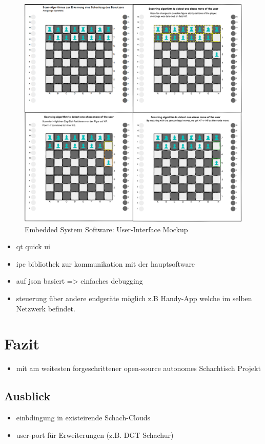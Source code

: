\begin{figure}
\centering
\includegraphics{images/ATC_ChessMoveAlgorithm.png}
\caption{Embedded System Software: User-Interface Mockup}
\end{figure}

\begin{itemize}
\tightlist
\item
  qt quick ui
\item
  ipc bibliothek zur kommunikation mit der hauptsoftware
\item
  auf json basiert =\textgreater{} einfaches debugging
\item
  steuerung über andere endgeräte möglich z.B Handy-App welche im selben
  Netzwerk befindet.
\end{itemize}

\hypertarget{fazit}{%
\section{Fazit}\label{fazit}}

\begin{itemize}
\tightlist
\item
  mit am weitesten forgeschrittener open-source autonomes Schachtisch
  Projekt
\end{itemize}

\hypertarget{ausblick}{%
\subsection{Ausblick}\label{ausblick}}

\begin{itemize}
\tightlist
\item
  einbdingung in existeirende Schach-Clouds
\item
  user-port für Erweiterungen (z.B. DGT Schachur)
\end{itemize}
